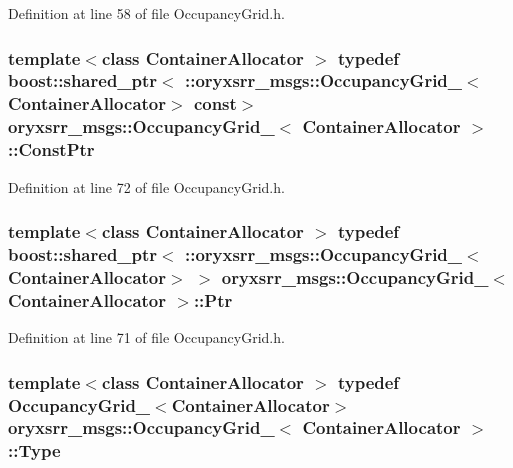 \-Definition at line 58 of file \-Occupancy\-Grid.\-h.

\subsubsection[{\-Const\-Ptr}]{\setlength{\rightskip}{0pt plus 5cm}template$<$class Container\-Allocator $>$ typedef boost\-::shared\-\_\-ptr$<$ \-::{\bf oryxsrr\-\_\-msgs\-::\-Occupancy\-Grid\-\_\-}$<$\-Container\-Allocator$>$ const$>$ {\bf oryxsrr\-\_\-msgs\-::\-Occupancy\-Grid\-\_\-}$<$ \-Container\-Allocator $>$\-::{\bf \-Const\-Ptr}}\label{structoryxsrr__msgs_1_1OccupancyGrid___a7b892e7236d486412730a0de19ea8f24}


\-Definition at line 72 of file \-Occupancy\-Grid.\-h.

\subsubsection[{\-Ptr}]{\setlength{\rightskip}{0pt plus 5cm}template$<$class Container\-Allocator $>$ typedef boost\-::shared\-\_\-ptr$<$ \-::{\bf oryxsrr\-\_\-msgs\-::\-Occupancy\-Grid\-\_\-}$<$\-Container\-Allocator$>$ $>$ {\bf oryxsrr\-\_\-msgs\-::\-Occupancy\-Grid\-\_\-}$<$ \-Container\-Allocator $>$\-::{\bf \-Ptr}}\label{structoryxsrr__msgs_1_1OccupancyGrid___a99b687783c1dab3cacf31dceddaead21}


\-Definition at line 71 of file \-Occupancy\-Grid.\-h.

\subsubsection[{\-Type}]{\setlength{\rightskip}{0pt plus 5cm}template$<$class Container\-Allocator $>$ typedef {\bf \-Occupancy\-Grid\-\_\-}$<$\-Container\-Allocator$>$ {\bf oryxsrr\-\_\-msgs\-::\-Occupancy\-Grid\-\_\-}$<$ \-Container\-Allocator $>$\-::{\bf \-Type}}\label{structoryxsrr__msgs_1_1OccupancyGrid___a5e0a82fdac94b2fb5dd2bbbab6550c6a}


